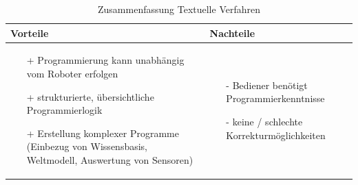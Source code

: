 \begin{table}[!h]
\centering
\begin{tabular}{|p{7.5cm}|p{7.5cm}|}
\hline
Vorteile & Nachteile\\
\hline
\vspace{-5mm}
\begin{itemize}
\setlength\itemsep{0em}
\item[+] Programmierung kann unabhängig vom Roboter erfolgen
\item[+] strukturierte, übersichtliche Programmierlogik
\item[+] Erstellung komplexer Programme (Einbezug von Wissensbasis,
Weltmodell, Auswertung von Sensoren)
\end{itemize}
 &
 \vspace{-5mm}
\begin{itemize}
\setlength\itemsep{0em}
\item[-] Bediener benötigt Programmierkenntnisse
\item[-] keine / schlechte Korrekturmöglichkeiten
\end{itemize}\\
\hline
\end{tabular}
\caption{Zusammenfassung Textuelle Verfahren}
\label{tab:textprog}
\end{table}
